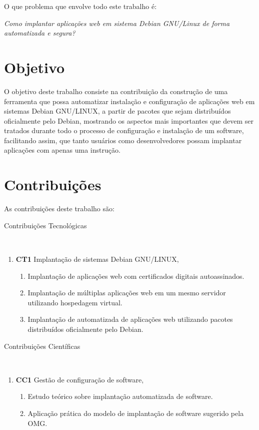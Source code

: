 O que problema que envolve todo este trabalho é:

\begin{center}
  \textit{
  Como implantar aplicações web em sistema Debian GNU/Linux de forma automatizada
  e segura?
}
\end{center}

\section{Objetivo}

O objetivo deste trabalho consiste na contribuição da construção de uma ferramenta
que possa automatizar instalação e configuração de aplicações web em sistemas
Debian GNU/LINUX, a partir de pacotes que sejam distribuídos oficialmente pelo
Debian, mostrando os aspectos mais importantes que devem ser tratados durante
todo o processo de configuração e instalação de um software, facilitando assim, que
tanto usuários como desenvolvedores possam implantar aplicações com apenas uma
instrução.

\section{Contribuições}

As contribuições deste trabalho são:

\begin{description}
  \item [Contribuições Tecnológicas]\
\end{description}
    \begin{enumerate}
      \item \textbf{CT1} Implantação de sistemas Debian GNU/LINUX,
        \begin{enumerate}
          \item Implantação de aplicações web com certificados digitais autoassinados.
          \item Implantação de múltiplas aplicações web em um mesmo servidor utilizando
          hospedagem virtual.
          \item Implantação de automatizada de aplicações web utilizando pacotes
          distribuídos oficialmente pelo Debian.
        \end{enumerate}
    \end{enumerate}

\begin{description}
  \item [Contribuições Científicas]\
\end{description}
    \begin{enumerate}
      \item \textbf{CC1} Gestão de configuração de software,
        \begin{enumerate}
          \item Estudo teórico sobre implantação automatizada de software.
          \item Aplicação prática do modelo de implantação de software sugerido
pela OMG.
        \end{enumerate}
    \end{enumerate}


